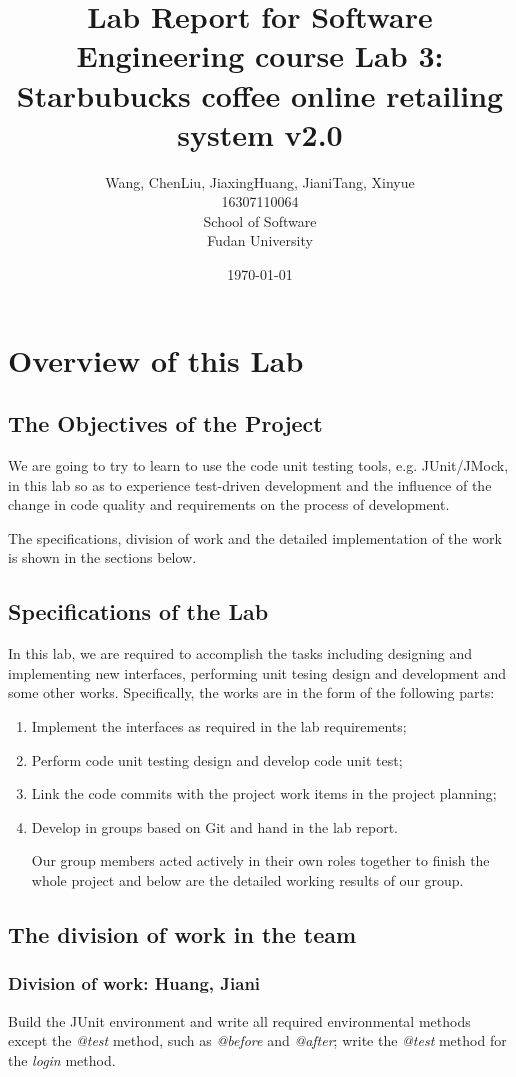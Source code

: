 \documentclass[a4paper]{report}
\title{Lab Report for Software Engineering course \newline
 Lab 3: Starbubucks coffee online retailing system v2.0}
\author{Wang, Chen\qquad Liu, Jiaxing\qquad Huang, Jiani\qquad Tang, Xinyue \\
16307110064\qquad17302010049\qquad 17302010063\qquad 16307110476 \\
School of Software\\
Fudan University
 }
\date{\today}
\begin{document}
\maketitle

\tableofcontents
\chapter{Overview of this Lab}
\section{The Objectives of the Project}
We are going to try to learn to use the code unit testing tools, e.g. JUnit/JMock, in this lab so as to experience test-driven development and the influence of the change in code quality and requirements on the process of development.
\par
The specifications, division of work and the detailed implementation of the work is shown in the sections below.
\section{Specifications of the Lab}
In this lab, we are required to accomplish the tasks including designing and implementing new interfaces, performing unit tesing design and development and some other works. Specifically, the works are in the form of the following parts:
\begin{enumerate}
\item Implement the interfaces as required in the lab requirements;
\item Perform code unit testing design and develop code unit test;
\item Link the code commits with the project work items in the project planning;
\item Develop in groups based on Git and hand in the lab report.
\par
Our group members acted actively in their own roles together to finish the whole project and below are the detailed working results of our group.
\end{enumerate}
\section{The division of work in the team}
\subsection{Division of work: Huang, Jiani}
Build the JUnit environment and write all required environmental methods except the \emph{@test} method, such as \emph{@before} and \emph{@after}; write the \emph{@test} method for the \emph{login} method.
\end{document}
